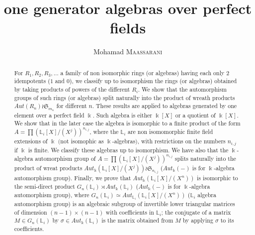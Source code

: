 \documentclass[12pt, reqno]{amsart}
\newcommand{\K}{ {\Bbbk} }
\newcommand{\FL}{ {\mathbb L} }
\begin{document}
 
\title{one generator algebras over perfect fields}

 


 
\author{Mohamad \textsc{Maassarani} }
\maketitle
\begin{abstract}
For $R_1,R_2,R_3,\dots$ a family of non isomorphic rings (or algebras) having each only 2 idempotents ($1$ and $0$), we classify up to isomorphism the rings (or algebras) obtained by taking products of powers of the different $R_i$. We show that the automorphism groups of such rings (or algebras) split naturally into the product of wreath products $Aut( R_n)\wr \mathfrak{S}_{m_n} $ for different $n$. These results are applied to algebras generated by one element over a perfect field $\K$. Such algebra is either $\K[X]$ or a quotient of $\K[X]$. We show that in the later case the algebra is isomorphic to a finite product of the form $A=\prod (\FL_i[X]/(X^j))^{n_{i,j}}$, where the $\FL_i$ are non isomomorphic finite field extensions of $\K$ $($not isomophic as $\K$-algebras$)$, with restrictions on the numbers $n_{i,j}$ if $\K$ is finite. We classify these algebras up to isomorphism. We have also that the $\K$-algebra automorphism group of $A=\prod (\FL_i[X]/(X^j))^{n_{i,j}}$ splits naturally into the product of wreat products $Aut_\K(\FL_i[X]/(X^j) )\wr \mathfrak{S}_{n_{i,j}}$  ($Aut_\K(-)$ is for $\K$-algebra automorphism group). Finally, we prove that $Aut_\K(\FL_i[X]/(X^n) )$ is isomorphic to the semi-direct product $G_n(\FL_i)\rtimes Aut_\K(\FL_i)$  ($Aut_\K(-)$ is for $\K$-algebra automorphism group), where $G_n(\FL_i)\simeq Aut_{\FL_i}(\FL_i[X]/(X^n) )$ ($\FL_i$ algebra automorphism group) is an algebraic subgroup of invertible lower triangular matrices of dimension $(n-1)\times (n-1)$ with coefficients in $\FL_i$; the conjugate of a matrix $M\in G_n(\FL_i)$ by $\sigma \in Aut_\K(\FL_i)$ is the matrix obtained from $M$ by applying $\sigma$ to its coefficients.

\end{abstract}
\end{document}
